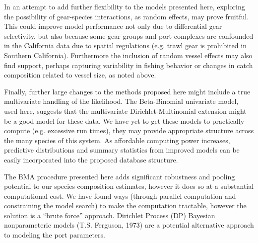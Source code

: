 \documentclass[12pt]{article}
\begin{document}
In an attempt to add further flexibility to the models presented here,
exploring the possibility of gear-species interactions, as random
effects, may prove fruitful. This could improve model performance not only due 
to differential gear selectivity, but also because some gear groups and port 
complexes are confounded in the California data due to spatial regulations 
(e.g. trawl gear is prohibited in Southern California). Furthermore the 
inclusion of random vessel effects may also find support, perhaps capturing 
variability in fishing behavior or changes in catch composition related to 
vessel size, as noted above.

Finally, further large changes to the methods proposed here might include a 
true multivariate handling of the likelihood. The Beta-Binomial univariate 
model, used here, suggests that the multivariate Dirichlet-Multinomial 
extension might be a good model for these data. We have yet to get these 
models to practically compute (e.g. excessive run times), they may provide 
appropriate structure across the many species of this system. As affordable 
computing power increases, predictive distributions and summary statistics 
from improved models can be easily incorporated into the proposed database 
structure.

The BMA procedure presented here adds significant robustness and pooling
potential to our species composition estimates, however it does so at a
substantial computational cost. We have found ways (through parallel
computation and constraining the model search) to make the computation
tractable, however the solution is a ``brute force'' approach. Dirichlet
Process (DP) Bayesian nonparameteric models (T.S. Ferguson, 1973) are a 
potential alternative approach to modeling the port parameters.
\end{document}
